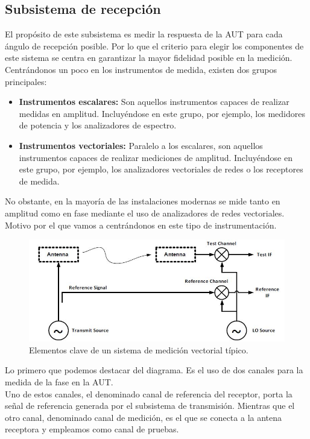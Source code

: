 \documentclass{article}
\begin{document}
\subsection{Subsistema de recepción}

El propósito de este subsistema es medir la respuesta de la AUT para cada ángulo de recepción posible. Por lo que el criterio para elegir los componentes de este sistema se centra en garantizar la mayor fidelidad posible en la medición. 
\\

Centrándonos un poco en los instrumentos de medida, existen dos grupos principales: 

\begin{itemize}
    \item \textbf{Instrumentos escalares:} Son aquellos instrumentos capaces de realizar medidas en amplitud. Incluyéndose en este grupo, por ejemplo, los medidores de potencia y los analizadores de espectro. 
    \item \textbf{Instrumentos vectoriales:} Paralelo a los escalares, son aquellos instrumentos capaces de realizar mediciones de amplitud. Incluyéndose en este grupo, por ejemplo, los analizadores vectoriales de redes o los receptores de medida. 
\end{itemize}
No obstante, en la mayoría de las instalaciones modernas se mide tanto en amplitud como en fase mediante el uso de analizadores de redes vectoriales. Motivo por el que vamos a centrándonos en este tipo de instrumentación. 

\newpage

\begin{figure}[h]
    \centering
    \includegraphics[scale=0.65]{Figura4-Elementos subsistema de recepcion}
    \caption{Elementos clave de un sistema de medición vectorial típico.}
    \label{Elementos-subsistema-de-recepcion}
\end{figure} 

Lo primero que podemos destacar del diagrama. Es el uso de dos canales para la medida de la fase en la AUT.\\
Uno de estos canales, el denominado canal de referencia del receptor, porta la señal de referencia generada por el subsistema de transmisión. Mientras que el otro canal, denominado canal de medición, es el que se conecta a la antena receptora y empleamos como canal de pruebas. 
\\
\end{document}
